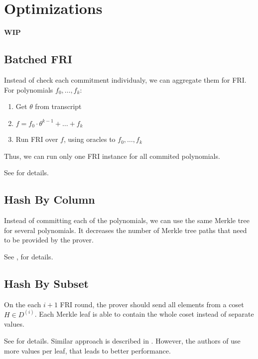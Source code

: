 \section{Optimizations}
\label{section:optimizations}
\textbf{WIP}

\subsection{Batched FRI}

Instead of check each commitment individualy, we can aggregate them for FRI.
For polynomials $f_0, \dots, f_k$:
\begin{enumerate}
	\item Get $\theta$ from transcript
	\item $f = f_0 \cdot \theta^{k - 1} + \dots + f_k$
	\item Run FRI over $f$, using oracles to $f_0, \dots, f_k$
\end{enumerate}

Thus, we can run only one FRI instance for all commited polynomials.

See \cite{cryptoeprint:2019:1400} for details.

\subsection{Hash By Column}

Instead of committing each of the polynomials, we can use the same Merkle tree for several polynomials. 
It decreases the number of Merkle tree paths that need to be provided by the prover. 

See \cite{cryptoeprint:2019:1076}, \cite{cryptoeprint:2019:1400} for details.

\subsection{Hash By Subset}

On the each $i + 1$ FRI round, the prover should send all elements from a coset $H \in D^{(i)}$.
Each Merkle leaf is able to contain the whole coset instead of separate values. 

See \cite{cryptoeprint:2019:1076} for details.
Similar approach is described in \cite{cryptoeprint:2019:1400}.
However, the authors of \cite{cryptoeprint:2019:1400} use more values per leaf, that leads to better performance. 